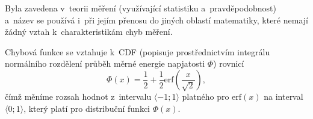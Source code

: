 Byla zavedena v~teorii měření (využívající statistiku a~pravděpodobnost) a~název se používá i~při jejím přenosu do jiných oblastí matematiky, které nemají žádný vztah k~charakteristikám chyb měření.

Chybová funkce se vztahuje k~CDF (popisuje prostřednictvím integrálu normálního rozdělení průběh měrné energie napjatosti $\varPhi$) rovnicí
\begin{equation}
	\varPhi(x) = \frac{1}{2} + \frac{1}{2} \mathrm{erf}\left(\frac{x}{\sqrt{2}}\right),
\end{equation}
čímž měníme rozsah hodnot z~intervalu $\langle -1;1 \rangle$ platného pro $\mathrm{erf}(x)$ na interval $\langle 0;1 \rangle$, který platí pro distribuční funkci $\varPhi(x)$.

